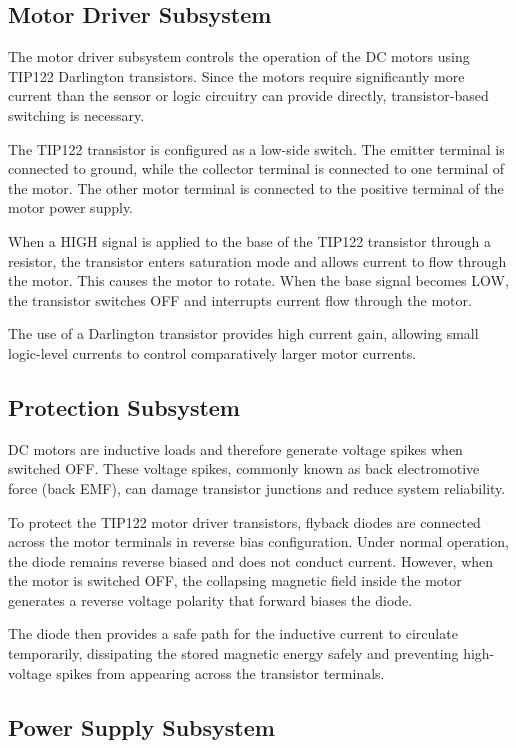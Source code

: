 \documentclass[conference]{IEEEtran}
\begin{document}
\subsection{Motor Driver Subsystem}

The motor driver subsystem controls the operation of the DC motors using TIP122 Darlington transistors. Since the motors require significantly more current than the sensor or logic circuitry can provide directly, transistor-based switching is necessary.

The TIP122 transistor is configured as a low-side switch. The emitter terminal is connected to ground, while the collector terminal is connected to one terminal of the motor. The other motor terminal is connected to the positive terminal of the motor power supply.

When a HIGH signal is applied to the base of the TIP122 transistor through a resistor, the transistor enters saturation mode and allows current to flow through the motor. This causes the motor to rotate. When the base signal becomes LOW, the transistor switches OFF and interrupts current flow through the motor.

The use of a Darlington transistor provides high current gain, allowing small logic-level currents to control comparatively larger motor currents.

\subsection{Protection Subsystem}

DC motors are inductive loads and therefore generate voltage spikes when switched OFF. These voltage spikes, commonly known as back electromotive force (back EMF), can damage transistor junctions and reduce system reliability.

To protect the TIP122 motor driver transistors, flyback diodes are connected across the motor terminals in reverse bias configuration. Under normal operation, the diode remains reverse biased and does not conduct current. However, when the motor is switched OFF, the collapsing magnetic field inside the motor generates a reverse voltage polarity that forward biases the diode.

The diode then provides a safe path for the inductive current to circulate temporarily, dissipating the stored magnetic energy safely and preventing high-voltage spikes from appearing across the transistor terminals.

\subsection{Power Supply Subsystem}
\end{document}
